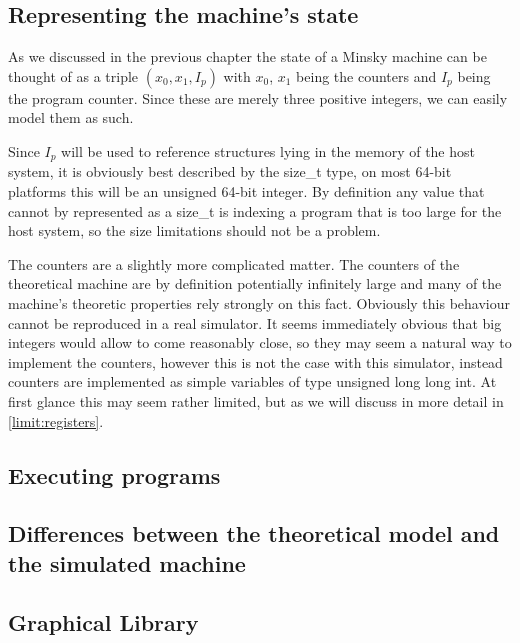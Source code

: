 \subsection{Representing the machine's state}
As we discussed in the previous chapter the state of a Minsky machine can be thought of as a triple $(x_0, x_1, I_p)$ with $x_0$, $x_1$ being the counters and $I_p$ being the program counter. Since these are merely three positive integers, we can easily model them as such.

Since $I_p$ will be used to reference structures lying in the memory of the host system, it is obviously best described by the size\_t type, on most 64-bit platforms this will be an unsigned 64-bit integer. By definition any value that cannot by represented as a size\_t is indexing a program that is too large for the host system, so the size limitations should not be a problem.

The counters are a slightly more complicated matter. The counters of the theoretical machine are by definition potentially infinitely large and many of the machine's theoretic properties rely strongly on this fact. Obviously this behaviour cannot be reproduced in a real simulator. It seems immediately obvious that big integers would allow to come reasonably close, so they may seem a natural way to implement the counters, however this is not the case with this simulator, instead counters are implemented as simple variables of type unsigned long long int. At first glance this may seem rather limited, but as we will discuss in more detail in \autoref{limit:registers}.
\subsection{Executing programs}
 
\subsection{Differences between the theoretical model and the simulated machine}

\subsection{Graphical Library}

